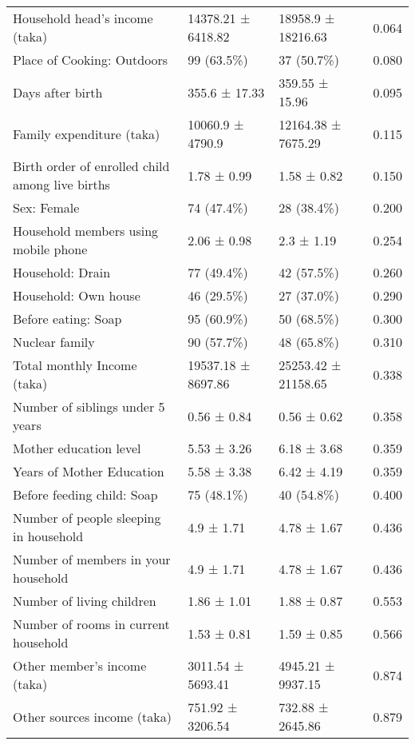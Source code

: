 \begin{longtable}{llll}
Household head’s income (taka)                  &   14378.21 ± 6418.82 &    18958.9 ± 18216.63 &   0.064 \\
Place of Cooking: Outdoors                      &           99 (63.5\%) &            37 (50.7\%) &   0.080 \\
Days after birth                                &        355.6 ± 17.33 &        359.55 ± 15.96 &   0.095 \\
Family expenditure (taka)                       &     10060.9 ± 4790.9 &    12164.38 ± 7675.29 &   0.115 \\
Birth order of enrolled child among live births &          1.78 ± 0.99 &           1.58 ± 0.82 &   0.150 \\
Sex: Female                                     &           74 (47.4\%) &            28 (38.4\%) &   0.200 \\
Household members using mobile phone            &          2.06 ± 0.98 &            2.3 ± 1.19 &   0.254 \\
Household: Drain                                &           77 (49.4\%) &            42 (57.5\%) &   0.260 \\
Household: Own house                            &           46 (29.5\%) &            27 (37.0\%) &   0.290 \\
Before eating: Soap                             &           95 (60.9\%) &            50 (68.5\%) &   0.300 \\
Nuclear family                                  &           90 (57.7\%) &            48 (65.8\%) &   0.310 \\
Total monthly Income (taka)                     &   19537.18 ± 8697.86 &   25253.42 ± 21158.65 &   0.338 \\
Number of siblings under 5 years                &          0.56 ± 0.84 &           0.56 ± 0.62 &   0.358 \\
Mother education level                          &          5.53 ± 3.26 &           6.18 ± 3.68 &   0.359 \\
Years of Mother Education                       &          5.58 ± 3.38 &           6.42 ± 4.19 &   0.359 \\
Before feeding child: Soap                      &           75 (48.1\%) &            40 (54.8\%) &   0.400 \\
Number of people sleeping in household          &           4.9 ± 1.71 &           4.78 ± 1.67 &   0.436 \\
Number of members in your household             &           4.9 ± 1.71 &           4.78 ± 1.67 &   0.436 \\
Number of living children                       &          1.86 ± 1.01 &           1.88 ± 0.87 &   0.553 \\
Number of rooms in current household            &          1.53 ± 0.81 &           1.59 ± 0.85 &   0.566 \\
Other member’s income (taka)                    &    3011.54 ± 5693.41 &     4945.21 ± 9937.15 &   0.874 \\
Other sources income (taka)                     &     751.92 ± 3206.54 &      732.88 ± 2645.86 &   0.879 \\
\end{longtable}
